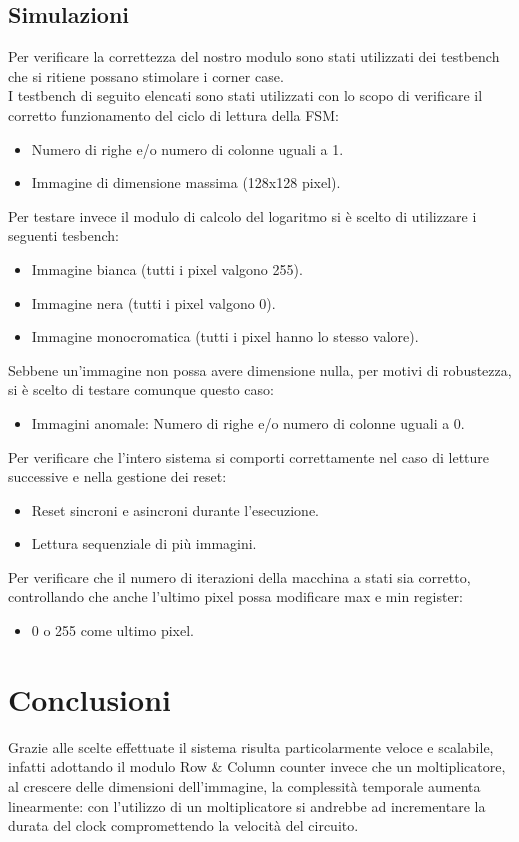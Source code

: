 \documentclass{article}
\begin{document}
\subsection{Simulazioni}
Per verificare la correttezza del nostro modulo sono stati utilizzati dei testbench che si ritiene possano stimolare i corner case.\\
I testbench di seguito elencati sono stati utilizzati con lo scopo di verificare il corretto funzionamento del ciclo di lettura della FSM:
\begin{itemize}
    \item Numero di righe e/o numero di colonne uguali a 1.
    \item Immagine di dimensione massima (128x128 pixel).
\end{itemize}
Per testare invece il modulo di calcolo del logaritmo si è scelto di utilizzare i seguenti tesbench:
\begin{itemize}
    \item Immagine bianca (tutti i pixel valgono 255).
    \item Immagine nera (tutti i pixel valgono 0).
    \item Immagine monocromatica (tutti i pixel hanno lo stesso valore).
\end{itemize}
Sebbene un'immagine non possa avere dimensione nulla, per motivi di robustezza, si è scelto di testare comunque questo caso:
\begin{itemize}
    \item Immagini anomale: Numero di righe e/o numero di colonne uguali a 0.
\end{itemize}
Per verificare che l'intero sistema si comporti correttamente nel caso di letture successive e nella gestione dei reset:
\begin{itemize}
    \item Reset sincroni e asincroni durante l'esecuzione.
\end{itemize}
\begin{itemize}
    \item Lettura sequenziale di più immagini.
\end{itemize}
Per verificare che il numero di iterazioni della macchina a stati sia corretto, controllando che anche l'ultimo pixel possa modificare max e min register:
\begin{itemize}
    \item 0 o 255 come ultimo pixel.
\end{itemize}
\section{Conclusioni}

Grazie alle scelte effettuate il sistema risulta particolarmente veloce e scalabile, infatti adottando il modulo Row \& Column counter invece che un moltiplicatore, al crescere delle dimensioni dell'immagine, la complessità temporale aumenta linearmente: con l'utilizzo di un moltiplicatore si andrebbe ad incrementare la durata del clock compromettendo la velocità del circuito.\\
\end{document}

